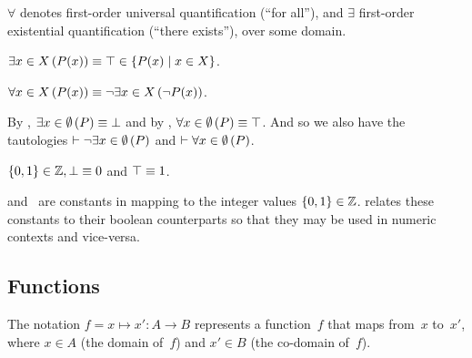 $\forall$ denotes first-order universal quantification (``for all''),
  and $\exists$ first-order existential quantification (``there exists''),
  over some domain.

\indexsym{}
\begin{definition}
  $\Exists{x\in X}{P(x)} \equiv
    \true \in \Set{P(x) \mid x\in X}$.
\end{definition}

\indexsym{}
\begin{definition}
  $\Forall{x\in X}{P(x)} \equiv \neg\Exists{x\in X}{\neg P(x)}$.
\end{definition}

\begin{remark}
  By , $\Exists{x\in\emptyset}P \equiv \false$
    and by , $\Forall{x\in\emptyset}P \equiv \true$.
  And so we also have the tautologies $\infer \neg\Exists{x\in\emptyset}P$
    and $\infer \Forall{x\in\emptyset}P$.
\end{remark}

\indexsym{}
%
\begin{definition}
  $\left\{0,1\right\}\in\mathbb{Z}, \bot \equiv 0$ and $\top \equiv 1$.
\end{definition}

\tamefalse{} and~\tametrue{} are constants in \tame{} mapping to the
  integer values $\{0,1\}\in\mathbb{Z}$.
 relates these constants to their
  boolean counterparts so that they may be used in numeric contexts
  and vice-versa.


\subsection{Functions}
\indexsym{}
\indexsym{}
The notation $f = x \mapsto x' : A\rightarrow B$ represents a function~$f$
  that maps from~$x$ to~$x'$,
    where $x\in A$ (the domain of~$f$) and $x'\in B$ (the co-domain of~$f$).

